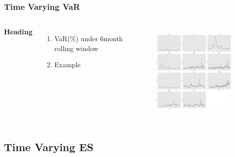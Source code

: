 \documentclass{beamer}
\newcommand\Fontviii{\fontsize{8}{9.2}\selectfont}
\begin{document}
\begin{frame}
\frametitle{Time Varying VaR}
\Fontviii
\begin{columns}[c] %

\textbf{Heading}
\begin{enumerate}
\item VaR(\%) under 6\-month rolling window
\item Example
\end{enumerate}

\begin{figure}[h]
\centering 
\includegraphics[width=6.5cm]{../results/VaR6mon_scaled}
\label{fig: VaR6mon}
\end{figure}
\end{columns}
\end{frame}

\subsection{Time Varying ES}
\end{document}
